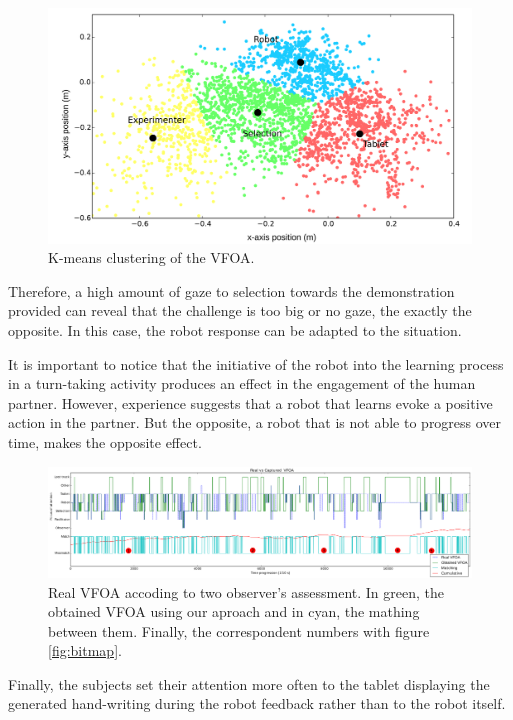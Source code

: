 \documentclass{sig-alternate}
\begin{document}
\begin{figure}[h!]
    \centering
    \includegraphics[width=0.9\columnwidth]{kmeans}
    \caption{\small K-means clustering of the VFOA.}
    \label{kmeans}
\end{figure}
        
Therefore, a high amount of gaze to selection towards the demonstration provided can reveal that the challenge is too big or no gaze, the exactly the opposite. In this case, the robot response can be adapted to the situation. 

It is important to notice that the initiative of the robot into the learning process in a turn-taking activity produces an effect in the engagement of the human partner. However, experience suggests that a robot that learns evoke a positive action in the partner. But the opposite, a robot that is not able to progress over time, makes the opposite effect.

\begin{figure}
    \centering
    \includegraphics[width=1.81\columnwidth]{realCaptured}
    \caption{\small Real VFOA accoding to two observer's assessment. In green, the obtained VFOA using our aproach and in cyan, the mathing between them. Finally, the correspondent numbers with figure \ref{fig:bitmap}.}
    \label{fig:realCaptured}
\end{figure}

Finally, the subjects set their attention more often to the tablet displaying the generated hand-writing during the robot feedback rather than to the robot itself. 
\end{document}
